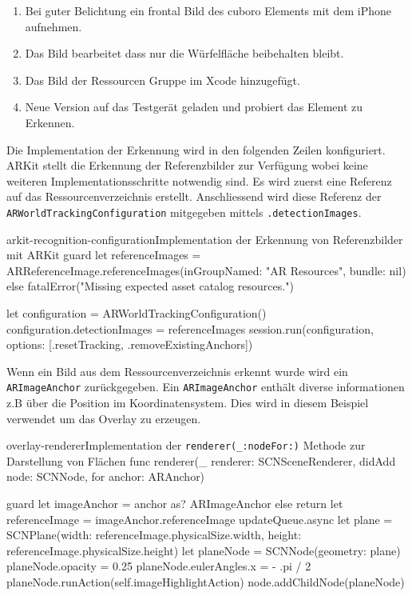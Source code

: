 \begin{description}
	\begin{enumerate}
		\item Bei guter Belichtung ein frontal Bild des cuboro Elements mit dem iPhone aufnehmen. 
		\item Das Bild bearbeitet dass nur die Würfelfläche beibehalten bleibt.
		\item Das Bild der Ressourcen Gruppe im Xcode hinzugefügt.
		\item Neue Version auf das Testgerät geladen und probiert das Element zu Erkennen.  
	\end{enumerate}



	Die Implementation der Erkennung wird in den folgenden Zeilen konfiguriert. ARKit stellt die Erkennung der Referenzbilder zur Verfügung wobei keine weiteren Implementationsschritte notwendig sind. Es wird zuerst eine Referenz auf das Ressourcenverzeichnis erstellt. Anschliessend wird diese Referenz der \texttt{ARWorldTrackingConfiguration} mitgegeben mittels \texttt{.detectionImages}.
	\begin{code}{arkit-recognition-configuration}{Implementation der Erkennung von Referenzbilder mit ARKit}
	guard let referenceImages = ARReferenceImage.referenceImages(inGroupNamed: "AR Resources", bundle: nil) else {
		fatalError("Missing expected asset catalog resources.")
	}
	
	let configuration = ARWorldTrackingConfiguration()
	configuration.detectionImages = referenceImages
	session.run(configuration, options: [.resetTracking, .removeExistingAnchors])
	\end{code}

	Wenn ein Bild aus dem Ressourcenverzeichnis erkennt wurde wird ein \texttt{ARImageAnchor} zurückgegeben. Ein \texttt{ARImageAnchor} enthält diverse informationen z.B über die Position im Koordinatensystem. Dies wird in diesem Beispiel verwendet um das Overlay zu erzeugen. 

	\begin{code}{overlay-renderer}{Implementation der \texttt{renderer(\_:nodeFor:)} Methode zur Darstellung von Flächen}
		func renderer(_ renderer: SCNSceneRenderer, didAdd node: SCNNode, for anchor: ARAnchor) {
			guard let imageAnchor = anchor as? ARImageAnchor else { return }
			let referenceImage = imageAnchor.referenceImage
			updateQueue.async {
				let plane = SCNPlane(width: referenceImage.physicalSize.width,
									height: referenceImage.physicalSize.height)
				let planeNode = SCNNode(geometry: plane)
				planeNode.opacity = 0.25
				planeNode.eulerAngles.x =  - .pi / 2
				planeNode.runAction(self.imageHighlightAction)
				node.addChildNode(planeNode)
			}

}
\end{code}
\end{description}
